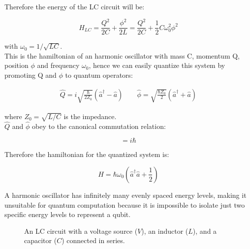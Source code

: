 Therefore the energy of the LC circuit will be:

\begin{equation}
    H_{LC} = \frac{Q^2}{2C} + \frac{\phi^2}{2L} = \frac{Q^2}{2C} + \frac{1}{2}C \omega_0^2 \phi^2 
\end{equation}

with $\omega_0 = 1 / \sqrt{LC}$.\\
This is the hamiltonian of an harmonic oscillator with mass C, momentum Q, position $\phi$ and frequency $\omega_0$, hence we can easily quantize
this system by promoting Q and $\phi$ to quantum operators:

\begin{align}
    \hat{Q} = i\sqrt{\frac{\hbar}{2 Z_0}}(\hat{a}^{\dagger} - \hat{a})
    \qquad
    \hat{\phi} = \sqrt{\frac{\hbar Z_0}{2}}(\hat{a}^{\dagger} + \hat{a})
\end{align}

where $Z_0= \sqrt{L / C}$ is the impedance.\\
$\hat{Q}$ and $\hat{\phi}$ obey to the canonical commutation relation:

\begin{equation}
    [\hat{Q}, \hat{\phi}] = i \hbar
\end{equation}

Therefore the hamiltonian for the quantized system is:

\begin{equation}
    H = \hbar \omega_0 (\hat{a}^{\dagger} \hat{a} + \frac{1}{2})
\end{equation}


A harmonic oscillator has infinitely many evenly spaced energy levels, making it unsuitable for quantum computation because it is impossible to 
isolate just two specific energy levels to represent a qubit.\\

\begin{figure}[ht]
    \centering
    \caption{An LC circuit with a voltage source ($V$), an inductor ($L$), and a capacitor ($C$) connected in series.}
    \label{fig:lc_circuit}
\end{figure}

